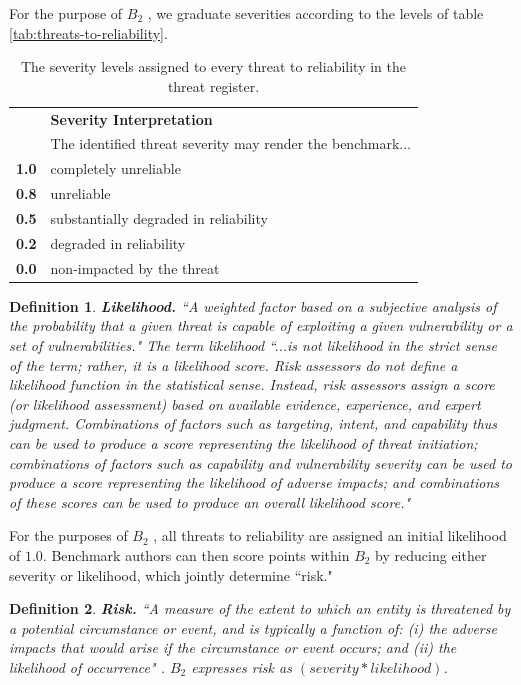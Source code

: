 \documentclass{article}
\newtheorem{dfn}{Definition}[section]
\newcommand\bb{$B_2$ }
\begin{document}
For the purpose of \bb, we graduate severities according to the levels of table \ref{tab:threats-to-reliability}.
\begin{table}[h!]
  \caption{The severity levels assigned to every threat to reliability in the threat register.}
  \label{tab:benchmark-reliability-dimensions}
\label{tab:severity}
  \centering
  \begin{tabular}{lp{10cm}}
    \toprule
    & \textbf{Severity Interpretation} \\
    & The identified threat severity may render the benchmark... \\
    \midrule
    \textbf{1.0} & completely unreliable \\
    \textbf{0.8} & unreliable \\
    \textbf{0.5} & substantially degraded in reliability  \\
    \textbf{0.2} & degraded in reliability \\
    \textbf{0.0} & non-impacted by the threat \\
    \bottomrule
  \end{tabular}
\end{table}

\begin{dfn}
{\bf Likelihood.} ``A weighted factor based on a subjective analysis of the probability that a given threat is capable of exploiting a given vulnerability or a set of vulnerabilities."\cite{cnssi4009} The term likelihood ``...is not likelihood in the strict sense of the term; rather, it is a likelihood score. Risk assessors do not define a likelihood function in the statistical sense. Instead, risk assessors assign a score (or likelihood assessment) based on available evidence, experience, and expert judgment. Combinations of factors such as targeting, intent, and capability thus can be used to produce a score representing the likelihood of threat initiation; combinations of factors such as capability and vulnerability severity can be used to produce a score representing the likelihood of adverse impacts; and combinations of these scores can be used to produce an overall likelihood score." \cite{nist80030r1}
\end{dfn}

For the purposes of \bb, all threats to reliability are assigned an initial likelihood of $1.0$. Benchmark authors can then score points within \bb by reducing either severity or likelihood, which jointly determine ``risk."

\begin{dfn}
{\bf Risk.} ``A measure of the extent to which an entity is threatened by a potential circumstance or event, and is typically a function of: (i) the adverse impacts that would arise if the circumstance or event occurs; and (ii) the likelihood of occurrence" \cite{nist80030r1}. \bb expresses risk as $(severity*likelihood)$.
\end{dfn}
\end{document}

